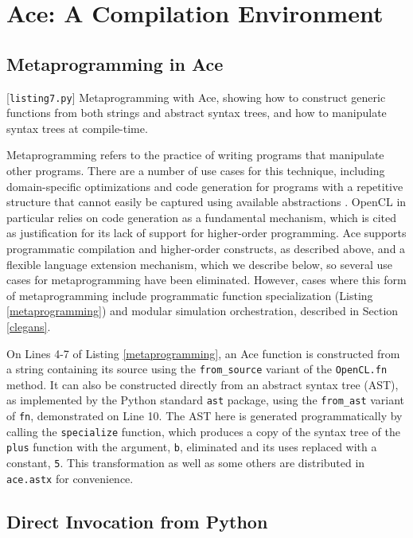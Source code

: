\documentclass{sig-alternate}
\begin{document}
\section{Ace: A Compilation Environment}\label{compenv}
\subsection{Metaprogramming in Ace}
\begin{codelisting}

\caption{[\texttt{listing7.py}] Metaprogramming with Ace, showing how to construct generic functions from both strings and abstract syntax trees, and how to manipulate syntax trees at compile-time.}
\label{metaprogramming}
\end{codelisting}
Metaprogramming refers to the practice of writing programs that manipulate other programs. There are a number of use cases for this technique, including domain-specific optimizations and code generation for programs with a repetitive structure that cannot easily be captured using available abstractions \cite{pyopencl}. OpenCL in particular relies on code generation as a fundamental mechanism, which is cited as justification for its lack of support for higher-order programming. Ace supports programmatic compilation and higher-order constructs, as described above, and a flexible language extension mechanism, which we describe below, so several use cases for metaprogramming have been eliminated. However, cases where this form of metaprogramming include programmatic function specialization (Listing \ref{metaprogramming}) and modular simulation orchestration, described in Section \ref{clegans}.

On Lines 4-7 of Listing \ref{metaprogramming}, an Ace function is constructed from a string containing its source using the \verb|from_source| variant of the \verb|OpenCL.fn| method. It can also be constructed directly from an abstract syntax tree (AST), as implemented by the Python standard \verb|ast| package, using the \verb|from_ast| variant of \verb|fn|, demonstrated on Line 10. The AST here is generated programmatically by calling the \verb|specialize| function, which produces a copy of the syntax tree of the \verb|plus| function with the argument, \verb|b|, eliminated and its uses replaced with a constant, \verb|5|. This transformation as well as some others are distributed in \verb|ace.astx| for convenience.
\subsection{Direct Invocation from Python}\label{direct}
\end{document}
